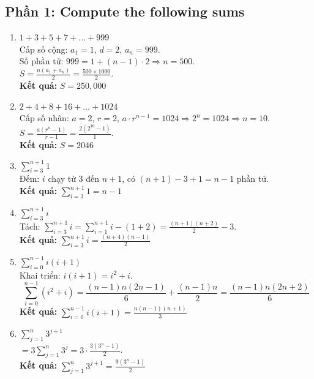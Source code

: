 \documentclass[12pt,a4paper]{article}
\begin{document}
\subsection*{Phần 1: Compute the following sums}

\begin{enumerate}
    \item[a.] $1 + 3 + 5 + 7 + \dots + 999$ \\
    Cấp số cộng: $a_1 = 1$, $d = 2$, $a_n = 999$. \\
    Số phần tử: $999 = 1 + (n-1) \cdot 2 \Rightarrow n = 500$. \\
    $S = \frac{n(a_1 + a_n)}{2} = \frac{500 \times 1000}{2}$. \\
    \textbf{Kết quả:} $S = 250,000$

    \item[b.] $2 + 4 + 8 + 16 + \dots + 1024$ \\
    Cấp số nhân: $a = 2$, $r = 2$, $a \cdot r^{n-1} = 1024 \Rightarrow 2^n = 1024 \Rightarrow n = 10$. \\
    $S = \frac{a(r^n - 1)}{r - 1} = \frac{2(2^{10} - 1)}{1}$. \\
    \textbf{Kết quả:} $S = 2046$

    \item[c.] $\displaystyle\sum_{i=3}^{n+1} 1$ \\
    Đếm: $i$ chạy từ $3$ đến $n+1$, có $(n+1) - 3 + 1 = n - 1$ phần tử. \\
    \textbf{Kết quả:} $\displaystyle\sum_{i=3}^{n+1} 1 = n - 1$

    \item[d.] $\displaystyle\sum_{i=3}^{n+1} i$ \\
    Tách: $\displaystyle\sum_{i=3}^{n+1} i = \sum_{i=1}^{n+1} i - (1+2) = \frac{(n+1)(n+2)}{2} - 3$. \\
    \textbf{Kết quả:} $\displaystyle\sum_{i=3}^{n+1} i = \frac{(n+4)(n-1)}{2}$

    \item[e.] $\displaystyle\sum_{i=0}^{n-1} i(i+1)$ \\
    Khai triển: $i(i+1) = i^2 + i$.
    $$ \sum_{i=0}^{n-1}(i^2 + i) = \frac{(n-1)n(2n-1)}{6} + \frac{(n-1)n}{2} = \frac{(n-1)n(2n+2)}{6} $$
    \textbf{Kết quả:} $\displaystyle\sum_{i=0}^{n-1} i(i+1) = \frac{n(n-1)(n+1)}{3}$

    \item[f.] $\displaystyle\sum_{j=1}^{n} 3^{j+1}$ \\
    $= 3\displaystyle\sum_{j=1}^{n} 3^j = 3 \cdot \frac{3(3^n - 1)}{2}$. \\
    \textbf{Kết quả:} $\displaystyle\sum_{j=1}^{n} 3^{j+1} = \frac{9(3^n - 1)}{2}$


\end{enumerate}
\end{document}
